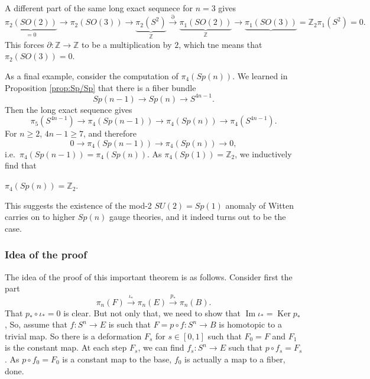 \documentclass[12pt]{article}
\numberwithin{equation}{section}
\def\bZ{\mathbb{Z}}
\def\Ker{\mathop{\mathrm{Ker}}}
\def\Im{\mathop{\mathrm{Im}}}
\begin{document}
A different part of the same long exact sequnece for $n=3$ gives \begin{equation}
  \underbrace{\pi_2(SO(2))}_{=0}
  \to \pi_2(SO(3)) 
  \to \underbrace{\pi_2(S^2)}_{\bZ}
  \stackrel{\partial}{\longrightarrow}  \underbrace{\pi_1(SO(2))}_{\bZ} \to \underbrace{\pi_1(SO(3))}=\bZ_2  \pi_1(S^2)=0.
\end{equation}
This forces $\partial:\bZ\to \bZ$ to be a multiplication by $2$,
which tne means that $\pi_2(SO(3))=0$.

As a final example, consider the computation of $\pi_4(Sp(n))$.
We learned in Proposition \ref{prop:Sp/Sp} that there is a fiber bundle
\begin{equation}
  Sp(n-1)\to Sp(n)\to S^{4n-1}.
\end{equation} Then the long exact sequence gives
\begin{equation}
  \pi_5(S^{4n-1})\to \pi_4(Sp(n-1))\to \pi_4(Sp(n))\to \pi_4(S^{4n-1}).
\end{equation} For $n\ge 2$, $4n-1\ge 7$, and therefore 
\begin{equation}
  0\to \pi_4(Sp(n-1))\to \pi_4(Sp(n))\to 0,
\end{equation} i.e.~$\pi_4(Sp(n-1))=\pi_4(Sp(n))$.
As $\pi_4(Sp(1))=\bZ_2$, we inductively find that 
\begin{example}
  $\pi_4(Sp(n))=\bZ_2$.  
\end{example}
This suggests the existence of the mod-2 $SU(2)=Sp(1)$ anomaly of Witten 
carries on to higher $Sp(n)$ gauge theories,
and it indeed turns out to be the case.

\subsubsection{Idea of the proof}
The idea of the proof of this important theorem is as follows.
Consider first the part \begin{equation}
\pi_{n}(F) \stackrel{\iota_*}{\longrightarrow} \pi_{n}(E) \stackrel{p_*}{\longrightarrow} \pi_{n}(B).
\end{equation}
That $p_*\circ \iota_*=0$ is clear.
But not only that, we need to show that $\Im \iota_* = \Ker p_*$,
So, assume that $f:S^n\to E$ is such that $F=p\circ f: S^n\to B$ is homotopic to a trivial map.
So there is a deformation $F_s$ for $s\in [0,1]$ such that $F_0=F$ and $F_1$ is the constant map.
At each step $F_s$, we can find $f_s:S^n \to E$ such that $p\circ f_s=F_s$.
As $p\circ f_0=F_0$ is a constant map to the base, $f_0$ is actually a map to a fiber, done.
\end{document}

